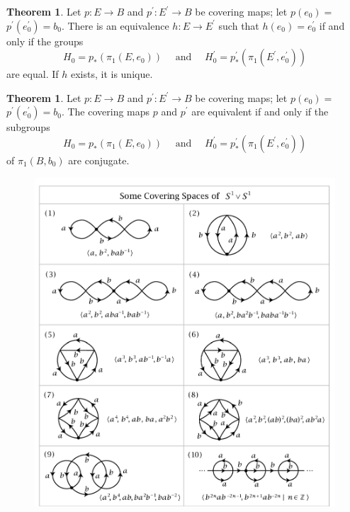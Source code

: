 \documentclass[12pt,a4paper]{book}
\theoremstyle{definition}
\newtheorem{theo}[defn]{Theorem}
\begin{document}
\begin{theo}
    Let $p: E \rightarrow B$ and $p^{\prime}: E^{\prime} \rightarrow B$ be covering maps; let $p\left(e_0\right)=$ $p^{\prime}\left(e_0^{\prime}\right)=b_0$. There is an equivalence $h: E \rightarrow E^{\prime}$ such that $h\left(e_0\right)=e_0^{\prime}$ if and only if the groups
    \begin{equation*}
        H_0=p_*\left(\pi_1\left(E, e_0\right)\right) \quad \text { and } \quad H_0^{\prime}=p_*^{\prime}\left(\pi_1\left(E^{\prime}, e_0^{\prime}\right)\right)
    \end{equation*}
    are equal. If $h$ exists, it is unique.
\end{theo}
\begin{theo}
    Let $p: E \rightarrow B$ and $p^{\prime}: E^{\prime} \rightarrow B$ be covering maps; let $p\left(e_0\right)=$ $p^{\prime}\left(e_0^{\prime}\right)=b_0$. The covering maps $p$ and $p^{\prime}$ are equivalent if and only if the subgroups
    \begin{equation*}
        H_0=p_*\left(\pi_1\left(E, e_0\right)\right) \quad \text { and } \quad H_0^{\prime}=p_*^{\prime}\left(\pi_1\left(E^{\prime}, e_0^{\prime}\right)\right)
    \end{equation*}
    of $\pi_1\left(B, b_0\right)$ are conjugate.
\end{theo}
\begin{figure}
        \includegraphics[scale=0.7]{covering space of eight.png}
        \centering
\end{figure}
\end{document}
